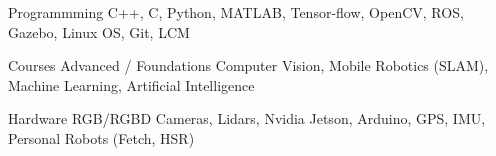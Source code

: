 

\begin{cvskills}

  \cvskill
    {Programmming} %
    {C++, C, Python, MATLAB, Tensor-flow, OpenCV, ROS, Gazebo, Linux OS, Git, LCM} %

	\cvskill
	{Courses} %
	{Advanced / Foundations Computer Vision, Mobile Robotics (SLAM), Machine Learning, Artificial Intelligence} %

	\cvskill
	{Hardware} %
	{RGB/RGBD Cameras, Lidars, Nvidia Jetson, Arduino, GPS, IMU, Personal Robots (Fetch, HSR)} %

\end{cvskills}
